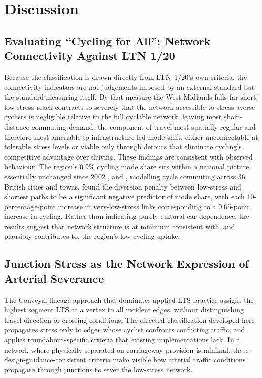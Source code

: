 \documentclass[final,5p,times,twocolumn,authoryear]{elsarticle}
\begin{document}
\section{Discussion}
\label{sec:discussion}

\subsection{Evaluating ``Cycling for All'': Network Connectivity Against LTN 1/20}
\label{sec:disc-cycling-for-all}

Because the classification is drawn directly from LTN~1/20's own criteria, the connectivity indicators are not judgements imposed by an external standard but the standard measuring itself. By that measure the West Midlands falls far short: low-stress reach contracts so severely that the network accessible to stress-averse cyclists is negligible relative to the full cyclable network, leaving most short-distance commuting demand, the component of travel most spatially regular and therefore most amenable to infrastructure-led mode shift, either unconnectable at tolerable stress levels or viable only through detours that eliminate cycling's competitive advantage over driving. These findings are consistent with observed behaviour. The region's 0.9\% cycling mode share sits within a national picture essentially unchanged since 2002 \citep{departmentfortransport2025}, and \citet{cervero2019}, modelling cycle commuting across 36 British cities and towns, found the diversion penalty between low-stress and shortest paths to be a significant negative predictor of mode share, with each 10-percentage-point increase in very-low-stress links corresponding to a 0.65-point increase in cycling. Rather than indicating purely cultural car dependence, the results suggest that network structure is at minimum consistent with, and plausibly contributes to, the region's low cycling uptake.

\subsection{Junction Stress as the Network Expression of Arterial Severance}
\label{sec:disc-junction}

The Conveyal-lineage approach that dominates applied LTS practice assigns the
highest segment LTS at a vertex to all incident edges, without distinguishing
travel direction or crossing conditions. The directed classification developed
here propagates stress only to edges whose cyclist confronts conflicting
traffic, and applies roundabout-specific criteria that existing implementations
lack. In a network where physically separated on-carriageway provision is
minimal, these design-guidance-consistent criteria make visible how arterial
traffic conditions propagate through junctions to sever the low-stress network.
\end{document}
